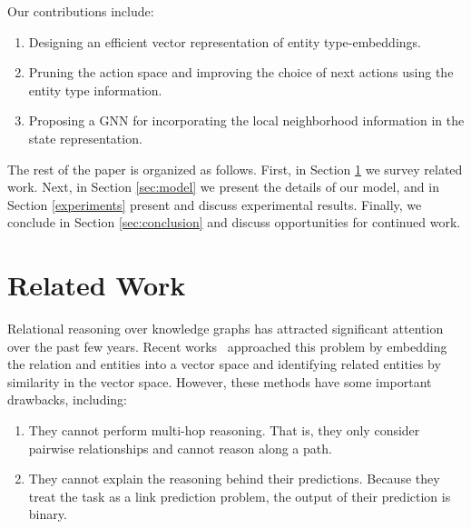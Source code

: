  


Our contributions include:
\begin{enumerate}
    \item Designing an efficient vector representation of entity type-embeddings.
    \item Pruning the action space and improving the choice of next actions using the entity type information. 
    \item Proposing a GNN for incorporating the local neighborhood information in the state representation.%
\end{enumerate}



The rest of the paper is organized as follows. First, in Section \ref{sec:related} we survey related work. Next, in Section \ref{sec:model} we present the details of our model, and in Section \ref{experiments} present and discuss experimental results. Finally, we conclude in Section \ref{sec:conclusion} and discuss opportunities for continued work.


\section{Related Work}
\label{sec:related}
Relational reasoning over knowledge graphs has attracted significant attention over the past few years. Recent works~\cite{bordes2013translating,socher2013reasoning,trouillon2016complex,jia2018knowledge,yang2014embedding,dettmers2018convolutional,yao2019graph} approached this problem by embedding the relation and entities into a vector space and identifying related entities by similarity in the vector space. However, these methods have some important drawbacks, including:
\begin{enumerate}
    \item They cannot perform multi-hop reasoning. That is, they only consider pairwise relationships and cannot reason along a path.
    \item They cannot explain the reasoning behind their predictions. Because they treat the task as a link prediction problem, the output of their prediction is binary.
\end{enumerate}

